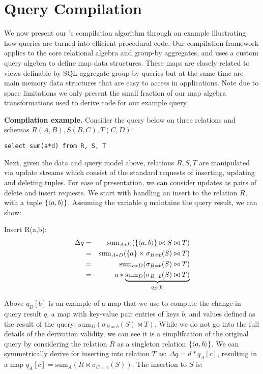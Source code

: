 
\section{Query Compilation}

\def\algsum{\mathrm{sum}}
\def\algagg{\mathrm{agg}}
\def\algtop{\mathrm{top}}
\def\algtopk{\mathrm{topk}}

\def\algsumr{\mbox{sumr}}
\def\algsumf{\mbox{sumf}}
\def\distinct{\mbox{distinct}}
\def\routerjoin{\bowtie\!=}

We now present our \compiler's compilation algorithm through an example
illustrating how queries are turned into efficient procedural code. Our
compilation framework applies to the core relational algebra and group-by
aggregates, and uses a custom query algebra to define map data structures. These
maps are closely related to views definable by SQL aggregate group-by queries but
at the same time are main memory data structures that are easy to access in
applications. Note due to space limitations we only present the small fraction
of our map algebra transformations used to derive code for our example query.

\noindent\textbf{Compilation example.} Consider the query below on three
relations and schemas $R(A,B), S(B,C), T(C,D)$:

\begin{verbatim}
select sum(a*d) from R, S, T
\end{verbatim}

Next, given the data and query model above, relations $R, S, T$ are
manipulated via update streams which consist of the standard requests
of inserting, updating and deleting tuples. For ease of presentation, we can
consider updates as pairs of delete and insert requests. We start with handling
an insert to the relation $R$, with a tuple $\{{\langle a,b\rangle}\}$. Assuming
the variable $q$ maintains the query result, we can show:

\smallskip
Insert R(a,b):
\begin{eqnarray*}
\Delta q &=& \algsum_{A*D}(\{\tuple{a,b}\} \bowtie S \bowtie T)
\\ &=&
\algsum_{A*D}(\{a\} \times \sigma_{B=b}(S) \bowtie T)
\\ &=&
\algsum_{a*D}(\sigma_{B=b}(S) \bowtie T)
\\ &=&
a * \underbrace{\algsum_{D}(\sigma_{B=b}(S) \bowtie T)}_{q_D[b]}
\end{eqnarray*}

Above $q_D[b]$ is an example of a map that we use to compute the change in query
result $q$, a map with key-value pair entries of keys $b$, and values defined as
the result of the query: $\algsum_{D}(\sigma_{B=b}(S) \bowtie T)$. While we do
not go into the full details of the derivation validity, we can see it is a
simplifcation of the original query by considering the relation $R$ as a
singleton relation $\{{\langle a,b\rangle}\}$. We can symmetrically derive for inserting
into relation $T$ as: $\Delta q = d * q_A[c]$, resulting in a map
$q_A[c] = \algsum_{A}(R \bowtie \sigma_{C=c}(S))$. The insertion to $S$ is:

